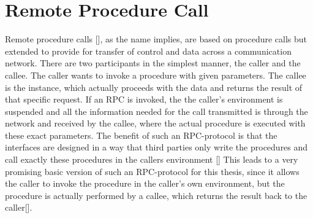\section{Remote Procedure Call}
Remote procedure calls [], as the name implies, are based on procedure calls but extended
to provide for transfer of control and data across a communication network. There are
two participants in the simplest manner, the caller and the callee. The caller wants to invoke a
procedure with given parameters. The callee is the instance, which actually proceeds with
the data and returns the result of that specific request. If an RPC is invoked, the the caller’s
environment is suspended and all the information needed for the call transmitted is through the
network and received by the callee, where the actual procedure is executed with these exact
parameters. The benefit of such an RPC-protocol is that the interfaces are designed in a
way that third parties only write the procedures and call exactly these procedures in the
callers environment [] This leads to a very promising basic version of such
an RPC-protocol for this thesis, since it allows the caller to invoke the procedure in the caller's own  environment, but the procedure is actually performed by a callee, which returns the result back to the caller[].